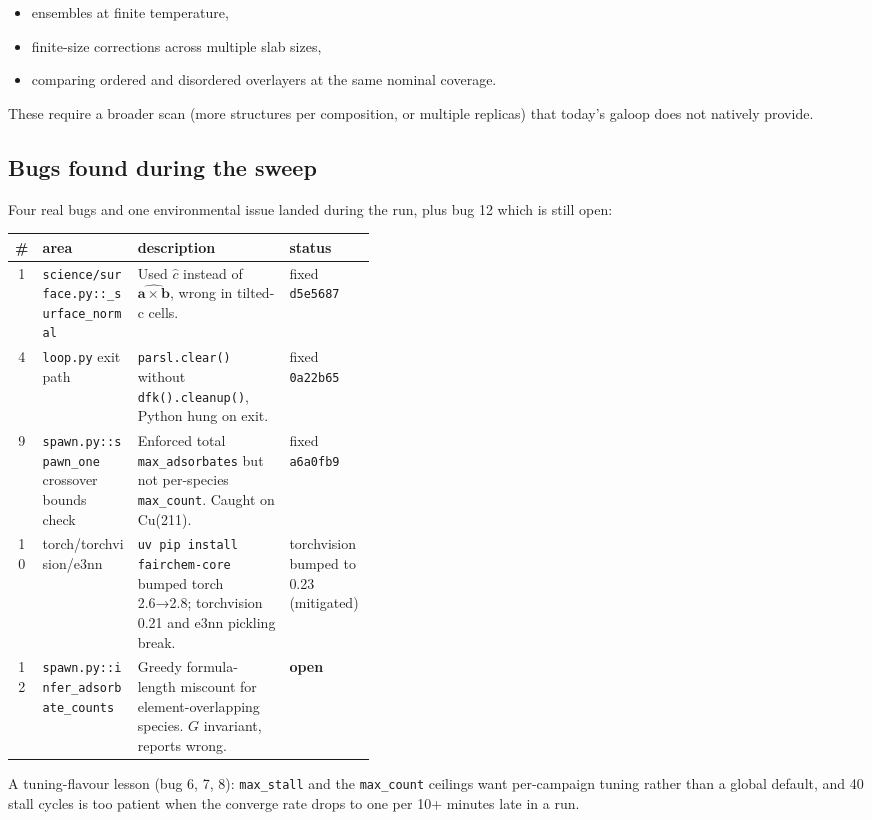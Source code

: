 \documentclass[11pt,a4paper]{article}
\begin{document}
\begin{itemize}
  \item ensembles at finite temperature,
  \item finite-size corrections across multiple slab sizes,
  \item comparing ordered and disordered overlayers at the same
    nominal coverage.
\end{itemize}

\noindent These require a broader scan (more structures per
composition, or multiple replicas) that today's galoop does not
natively provide.

\subsection{Bugs found during the sweep}

Four real bugs and one environmental issue landed during the run,
plus bug 12 which is still open:

\begin{center}\small
\begin{tabular}{clp{0.42\linewidth}l}
\toprule
\# & area & description & status \\
\midrule
1  & \texttt{science/surface.py::\_surface\_normal} & Used $\hat{c}$ instead of $\widehat{\mathbf{a}\!\times\!\mathbf{b}}$, wrong in tilted-c cells. & fixed \texttt{d5e5687} \\
4  & \texttt{loop.py} exit path & \texttt{parsl.clear()} without \texttt{dfk().cleanup()}, Python hung on exit. & fixed \texttt{0a22b65} \\
9  & \texttt{spawn.py::spawn\_one} crossover bounds check & Enforced total \texttt{max\_adsorbates} but not per-species \texttt{max\_count}. Caught on Cu(211). & fixed \texttt{a6a0fb9} \\
10 & torch/torchvision/e3nn & \texttt{uv pip install fairchem-core} bumped torch 2.6→2.8; torchvision 0.21 and e3nn pickling break. & torchvision bumped to 0.23 (mitigated) \\
12 & \texttt{spawn.py::infer\_adsorbate\_counts} & Greedy formula-length miscount for element-overlapping species. $G$ invariant, reports wrong. & \textbf{open} \\
\bottomrule
\end{tabular}
\end{center}

\noindent A tuning-flavour lesson (bug 6, 7, 8): \texttt{max\_stall}
and the \texttt{max\_count} ceilings want per-campaign tuning rather
than a global default, and 40 stall cycles is too patient when the
converge rate drops to one per 10+ minutes late in a run.
\end{document}
